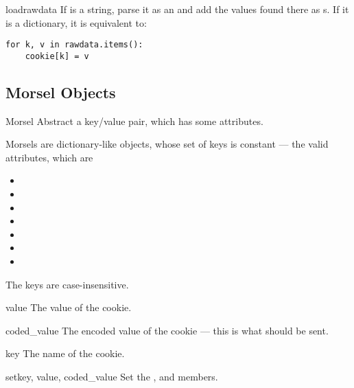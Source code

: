 \begin{methoddesc}[BaseCookie]{load}{rawdata}
If  is a string, parse it as an  and add
the values found there as s. If it is a dictionary, it
is equivalent to:

\begin{verbatim}
for k, v in rawdata.items():
    cookie[k] = v
\end{verbatim}
\end{methoddesc}


\subsection{Morsel Objects \label{morsel-objects}}

\begin{classdesc}{Morsel}{}
Abstract a key/value pair, which has some  attributes.

Morsels are dictionary-like objects, whose set of keys is constant ---
the valid  attributes, which are

\begin{itemize}
\item {}
\item {}
\item {}
\item {}
\item {}
\item {}
\item {}
\end{itemize}

The keys are case-insensitive.
\end{classdesc}

\begin{memberdesc}[Morsel]{value}
The value of the cookie.
\end{memberdesc}

\begin{memberdesc}[Morsel]{coded_value}
The encoded value of the cookie --- this is what should be sent.
\end{memberdesc}

\begin{memberdesc}[Morsel]{key}
The name of the cookie.
\end{memberdesc}

\begin{methoddesc}[Morsel]{set}{key, value, coded_value}
Set the ,  and  members.
\end{methoddesc}

